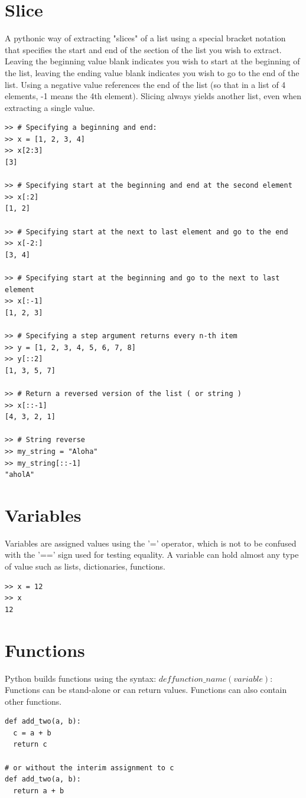 \documentclass[12pt,a4paper,final,twoside,onecolumn,titlepage]{book}
\begin{document}
\section{Slice}
A pythonic way of extracting "slices" of a list using a special bracket notation that specifies the start and end of the section of the list you wish to extract. Leaving the beginning value blank indicates you wish to start at the beginning of the list, leaving the ending value blank indicates you wish to go to the end of the list. Using a negative value references the end of the list (so that in a list of 4 elements, -1 means the 4th element). Slicing always yields another list, even when extracting a single value. 
\lstset{language=Python, tabsize=4}
\begin{lstlisting}
>> # Specifying a beginning and end:
>> x = [1, 2, 3, 4]
>> x[2:3]
[3]

>> # Specifying start at the beginning and end at the second element
>> x[:2]
[1, 2]

>> # Specifying start at the next to last element and go to the end
>> x[-2:]
[3, 4]

>> # Specifying start at the beginning and go to the next to last element
>> x[:-1]
[1, 2, 3]

>> # Specifying a step argument returns every n-th item
>> y = [1, 2, 3, 4, 5, 6, 7, 8]
>> y[::2]
[1, 3, 5, 7]

>> # Return a reversed version of the list ( or string )
>> x[::-1]
[4, 3, 2, 1]

>> # String reverse
>> my_string = "Aloha"
>> my_string[::-1]
"aholA"
\end{lstlisting}

\section{Variables}
Variables are assigned values using the '=' operator, which is not to be confused with the '==' sign used for testing equality. A variable can hold almost any type of value such as lists, dictionaries, functions. 
\lstset{language=Python, tabsize=4}
\begin{lstlisting}
>> x = 12
>> x
12
\end{lstlisting}

\section{Functions}
 Python builds functions using the syntax: $def function\_name(variable): $ Functions can be stand-alone or can return values. Functions can also contain other functions.
\lstset{language=Python, tabsize=4}
\begin{lstlisting}
def add_two(a, b):
  c = a + b
  return c

# or without the interim assignment to c
def add_two(a, b):
  return a + b
\end{lstlisting}
\end{document}
